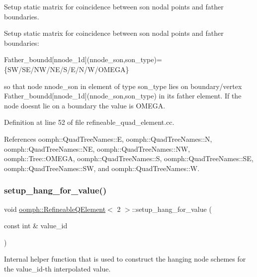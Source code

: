 Setup static matrix for coincidence between son nodal points and father boundaries. 

Setup static matrix for coincidence between son nodal points and father boundaries\+:

Father\+\_\+boundd\mbox{[}nnode\+\_\+1d\mbox{]}(nnode\+\_\+son,son\+\_\+type)=\{S\+W/\+S\+E/\+N\+W/\+N\+E/\+S/\+E/\+N/\+W/\+O\+M\+E\+GA\}

so that node nnode\+\_\+son in element of type son\+\_\+type lies on boundary/vertex Father\+\_\+boundd\mbox{[}nnode\+\_\+1d\mbox{]}(nnode\+\_\+son,son\+\_\+type) in its father element. If the node doesn\textquotesingle{}t lie on a boundary the value is O\+M\+E\+GA. 

Definition at line 52 of file refineable\+\_\+quad\+\_\+element.\+cc.



References oomph\+::\+Quad\+Tree\+Names\+::E, oomph\+::\+Quad\+Tree\+Names\+::N, oomph\+::\+Quad\+Tree\+Names\+::\+NE, oomph\+::\+Quad\+Tree\+Names\+::\+NW, oomph\+::\+Tree\+::\+O\+M\+E\+GA, oomph\+::\+Quad\+Tree\+Names\+::S, oomph\+::\+Quad\+Tree\+Names\+::\+SE, oomph\+::\+Quad\+Tree\+Names\+::\+SW, and oomph\+::\+Quad\+Tree\+Names\+::W.

\mbox{\label{classoomph_1_1RefineableQElement_3_012_01_4_a8bbe1fddb5da77e580fd1d2f90468061}} 
\subsubsection{\texorpdfstring{setup\+\_\+hang\+\_\+for\+\_\+value()}{setup\_hang\_for\_value()}}
{\footnotesize\ttfamily void \hyperlink{classoomph_1_1RefineableQElement}{oomph\+::\+Refineable\+Q\+Element}$<$ 2 $>$\+::setup\+\_\+hang\+\_\+for\+\_\+value (\begin{DoxyParamCaption}\item[{const int \&}]{value\+\_\+id }\end{DoxyParamCaption})\hspace{0.3cm}{\ttfamily [protected]}}



Internal helper function that is used to construct the hanging node schemes for the value\+\_\+id-\/th interpolated value. 

